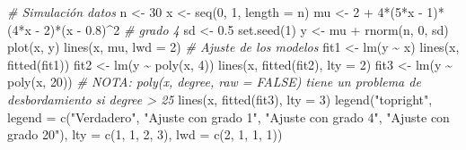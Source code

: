 \documentclass[
]{book}
\newenvironment{Shaded}{\begin{snugshade}}{\end{snugshade}}
\newcommand{\AttributeTok}[1]{\textcolor[rgb]{0.77,0.63,0.00}{#1}}
\newcommand{\CommentTok}[1]{\textcolor[rgb]{0.56,0.35,0.01}{\textit{#1}}}
\newcommand{\DecValTok}[1]{\textcolor[rgb]{0.00,0.00,0.81}{#1}}
\newcommand{\FloatTok}[1]{\textcolor[rgb]{0.00,0.00,0.81}{#1}}
\newcommand{\FunctionTok}[1]{\textcolor[rgb]{0.00,0.00,0.00}{#1}}
\newcommand{\NormalTok}[1]{#1}
\newcommand{\OtherTok}[1]{\textcolor[rgb]{0.56,0.35,0.01}{#1}}
\newcommand{\SpecialCharTok}[1]{\textcolor[rgb]{0.00,0.00,0.00}{#1}}
\newcommand{\StringTok}[1]{\textcolor[rgb]{0.31,0.60,0.02}{#1}}
\theoremstyle{break}
\theoremstyle{definition}
\theoremstyle{definition}
\theoremstyle{definition}
\theoremstyle{definition}
\theoremstyle{remark}
\begin{document}
\begin{Shaded}
\begin{Highlighting}[]
\CommentTok{\# Simulación datos}
\NormalTok{n }\OtherTok{\textless{}{-}} \DecValTok{30}
\NormalTok{x }\OtherTok{\textless{}{-}} \FunctionTok{seq}\NormalTok{(}\DecValTok{0}\NormalTok{, }\DecValTok{1}\NormalTok{, }\AttributeTok{length =}\NormalTok{ n)}
\NormalTok{mu }\OtherTok{\textless{}{-}} \DecValTok{2} \SpecialCharTok{+} \DecValTok{4}\SpecialCharTok{*}\NormalTok{(}\DecValTok{5}\SpecialCharTok{*}\NormalTok{x }\SpecialCharTok{{-}} \DecValTok{1}\NormalTok{)}\SpecialCharTok{*}\NormalTok{(}\DecValTok{4}\SpecialCharTok{*}\NormalTok{x }\SpecialCharTok{{-}} \DecValTok{2}\NormalTok{)}\SpecialCharTok{*}\NormalTok{(x }\SpecialCharTok{{-}} \FloatTok{0.8}\NormalTok{)}\SpecialCharTok{\^{}}\DecValTok{2} \CommentTok{\# grado 4}
\NormalTok{sd }\OtherTok{\textless{}{-}} \FloatTok{0.5}
\FunctionTok{set.seed}\NormalTok{(}\DecValTok{1}\NormalTok{)}
\NormalTok{y }\OtherTok{\textless{}{-}}\NormalTok{ mu }\SpecialCharTok{+} \FunctionTok{rnorm}\NormalTok{(n, }\DecValTok{0}\NormalTok{, sd)}
\FunctionTok{plot}\NormalTok{(x, y) }
\FunctionTok{lines}\NormalTok{(x, mu, }\AttributeTok{lwd =} \DecValTok{2}\NormalTok{)}
\CommentTok{\# Ajuste de los modelos}
\NormalTok{fit1 }\OtherTok{\textless{}{-}} \FunctionTok{lm}\NormalTok{(y }\SpecialCharTok{\textasciitilde{}}\NormalTok{ x)}
\FunctionTok{lines}\NormalTok{(x, }\FunctionTok{fitted}\NormalTok{(fit1))}
\NormalTok{fit2 }\OtherTok{\textless{}{-}} \FunctionTok{lm}\NormalTok{(y }\SpecialCharTok{\textasciitilde{}} \FunctionTok{poly}\NormalTok{(x, }\DecValTok{4}\NormalTok{))}
\FunctionTok{lines}\NormalTok{(x, }\FunctionTok{fitted}\NormalTok{(fit2), }\AttributeTok{lty =} \DecValTok{2}\NormalTok{)}
\NormalTok{fit3 }\OtherTok{\textless{}{-}} \FunctionTok{lm}\NormalTok{(y }\SpecialCharTok{\textasciitilde{}} \FunctionTok{poly}\NormalTok{(x, }\DecValTok{20}\NormalTok{)) }
\CommentTok{\# NOTA: poly(x, degree, raw = FALSE) tiene un problema de desbordamiento si degree \textgreater{} 25}
\FunctionTok{lines}\NormalTok{(x, }\FunctionTok{fitted}\NormalTok{(fit3), }\AttributeTok{lty =} \DecValTok{3}\NormalTok{)}
\FunctionTok{legend}\NormalTok{(}\StringTok{"topright"}\NormalTok{, }\AttributeTok{legend =} \FunctionTok{c}\NormalTok{(}\StringTok{"Verdadero"}\NormalTok{, }\StringTok{"Ajuste con grado 1"}\NormalTok{, }
                              \StringTok{"Ajuste con grado 4"}\NormalTok{, }\StringTok{"Ajuste con grado 20"}\NormalTok{), }
       \AttributeTok{lty =} \FunctionTok{c}\NormalTok{(}\DecValTok{1}\NormalTok{, }\DecValTok{1}\NormalTok{, }\DecValTok{2}\NormalTok{, }\DecValTok{3}\NormalTok{), }\AttributeTok{lwd =} \FunctionTok{c}\NormalTok{(}\DecValTok{2}\NormalTok{, }\DecValTok{1}\NormalTok{, }\DecValTok{1}\NormalTok{, }\DecValTok{1}\NormalTok{))}
\end{Highlighting}
\end{Shaded}
\end{document}
